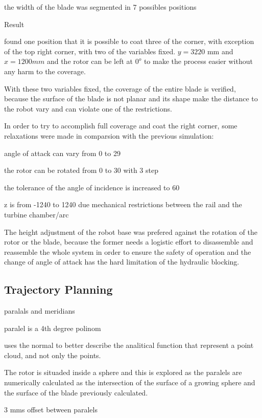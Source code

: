 the width of the blade was segmented in 7 possibles positions


Result

found one position that it is possible to coat three of the corner, with
exception of the top right corner, with two of the variables fixed. $y=3220$ mm
and $x=1200mm$ and the rotor can be left at $0^o$ to make the process easier
without any harm to the coverage.

With these two variables fixed, the coverage of the entire blade is verified,
because the surface of the blade is not planar and its shape make the distance
to the robot vary and can violate one of the restrictions.

In order to try to accomplish full coverage and coat the right corner, some
relaxations were made in comparsion with the previous simulation:

angle of attack can vary from 0 to 29

the rotor can be rotated from 0 to 30 with 3 step

the tolerance of the angle of incidence is increased to 60

z is from -1240 to 1240 due mechanical restrictions between the rail and the
turbine chamber/arc

The height adjustment of the robot base was prefered against the rotation of the
rotor or the blade, because the former needs a logistic effort to disassemble
and reassemble the whole system in order to ensure the safety of operation and
the change of angle of attack has the hard limitation of the hydraulic blocking.


\subsection{Trajectory Planning}

paralals and meridians

paralel is a 4th degree polinom

\cite{juttler2002least} uses the normal to better describe the analitical
function that represent a point cloud, and not only the points.

The rotor is situaded inside a sphere and this is explored as the paralels are
numerically calculated as the intersection of the surface of a growing sphere
and the surface of the blade previously calculated.

 3 mms offset
between paralels


 